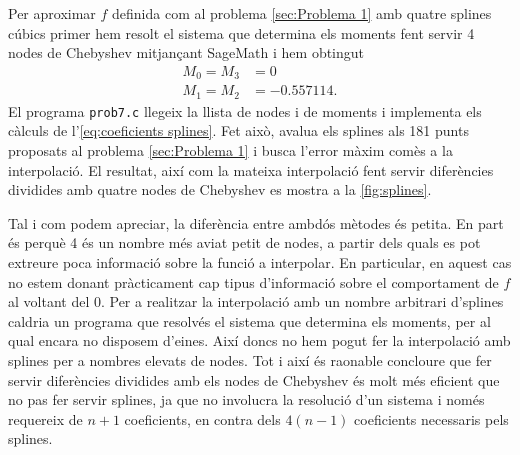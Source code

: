 \documentclass[12pt]{article}
\numberwithin{table}{section}
\numberwithin{figure}{section}
\numberwithin{equation}{section}
\begin{document}
Per aproximar \( f \) definida com al problema \ref{sec:Problema 1} amb quatre splines cúbics primer hem resolt el sistema que determina els moments fent servir 4 nodes de Chebyshev mitjançant \textsf{SageMath} i hem obtingut 
\begin{equation*}
	\begin{aligned}
		M_0 = M_3 &= 0 \\
		M_1 = M_2 &= \num{-0.557114}.
	\end{aligned}
\end{equation*}
El programa \texttt{prob7.c} llegeix la llista de nodes i de moments i implementa els càlculs de l'\cref{eq:coeficients splines}. Fet això, avalua els splines als 181 punts proposats al problema \ref{sec:Problema 1} i busca l'error màxim comès a la interpolació. El resultat, així com la mateixa interpolació fent servir diferències dividides amb quatre nodes de Chebyshev es mostra a la \cref{fig:splines}. 

Tal i com podem apreciar, la diferència entre ambdós mètodes és petita. En part és perquè 4 és un nombre més aviat petit de nodes, a partir dels quals es pot extreure poca informació sobre la funció a interpolar. En particular, en aquest cas no estem donant pràcticament cap tipus d'informació sobre el comportament de \( f \) al voltant del 0. Per a realitzar la interpolació amb un nombre arbitrari d'splines caldria un programa que resolvés el sistema que determina els moments, per al qual encara no disposem d'eines. Així doncs no hem pogut fer la interpolació amb splines per a nombres elevats de nodes. Tot i així és raonable concloure que fer servir diferències dividides amb els nodes de Chebyshev és molt més eficient que no pas fer servir splines, ja que no involucra la resolució d'un sistema i només requereix de \( n+1 \) coeficients, en contra dels \( 4(n - 1) \) coeficients necessaris pels splines.
\end{document}
